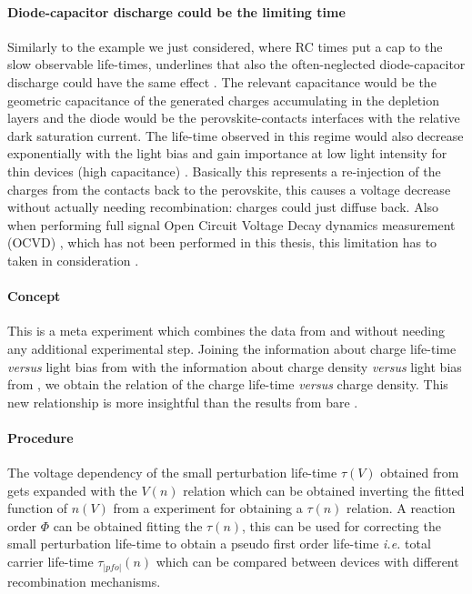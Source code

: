 \paragraph{Diode-capacitor discharge could be the limiting time}
Similarly to the example we just considered, where RC times put a cap to the slow observable life-times,  underlines that also the often-neglected diode-capacitor discharge could have the same effect \cite{Tvingstedt2017,Hellen2003}.
The relevant capacitance would be the geometric capacitance of the generated charges accumulating in the depletion layers and the diode would be the perovskite-contacts interfaces with the relative dark saturation current.
The life-time observed in this regime would also decrease exponentially with the light bias \cite{Castaner1981} and gain importance at low light intensity for thin devices (high capacitance) \cite{Kiermasch2018}.
Basically this represents a re-injection of the charges from the contacts back to the perovskite, this causes a voltage decrease without actually needing recombination: charges could just diffuse back.
Also when performing full signal Open Circuit Voltage Decay dynamics measurement (OCVD) \cite{Lederhandler1955,Mahan1981}, which has not been performed in this thesis, this limitation has to taken in consideration \cite{Tvingstedt2017,Pockett2017,Pockett2015,Kiermasch2018}.

\FloatBarrier
\newpage
{}\label{tpvce}

\paragraph{Concept}
This is a meta experiment which combines the data from  and  without needing any additional experimental step.
Joining the information about charge life-time \textsl{versus} light bias from  with the information about charge density \textsl{versus} light bias from , we obtain the relation of the charge life-time \textsl{versus} charge density.
This new relationship is more insightful than the results from bare .

\paragraph{Procedure}
The voltage dependency of the small perturbation life-time $\tau(V)$ obtained from  gets expanded with the $V(n)$ relation which can be obtained inverting the fitted function of $n(V)$ from a  experiment for obtaining a $\tau(n)$ relation.
A reaction order $\Phi$ can be obtained fitting the $\tau(n)$, this can be used for correcting the small perturbation life-time to obtain a pseudo first order life-time \textsl{i.e.} total carrier life-time $\tau_|pfo|(n)$ which can be compared between devices with different recombination mechanisms.


